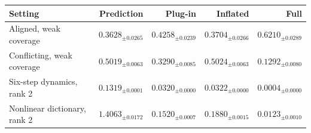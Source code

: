 \begin{tabular}{lrrrr}
\toprule
Setting & Prediction & Plug-in & Inflated & Full \\
\midrule
Aligned, weak coverage & $0.3628_{\pm 0.0265}$ & $0.4258_{\pm 0.0239}$ & $0.3704_{\pm 0.0266}$ & $0.6210_{\pm 0.0289}$ \\
Conflicting, weak coverage & $0.5019_{\pm 0.0063}$ & $0.3290_{\pm 0.0085}$ & $0.5024_{\pm 0.0063}$ & $0.1292_{\pm 0.0080}$ \\
Six-step dynamics, rank 2 & $0.1319_{\pm 0.0001}$ & $0.0320_{\pm 0.0000}$ & $0.0322_{\pm 0.0000}$ & $0.0004_{\pm 0.0000}$ \\
Nonlinear dictionary, rank 2 & $1.4063_{\pm 0.0172}$ & $0.1520_{\pm 0.0007}$ & $0.1880_{\pm 0.0015}$ & $0.0123_{\pm 0.0010}$ \\
\bottomrule
\end{tabular}

